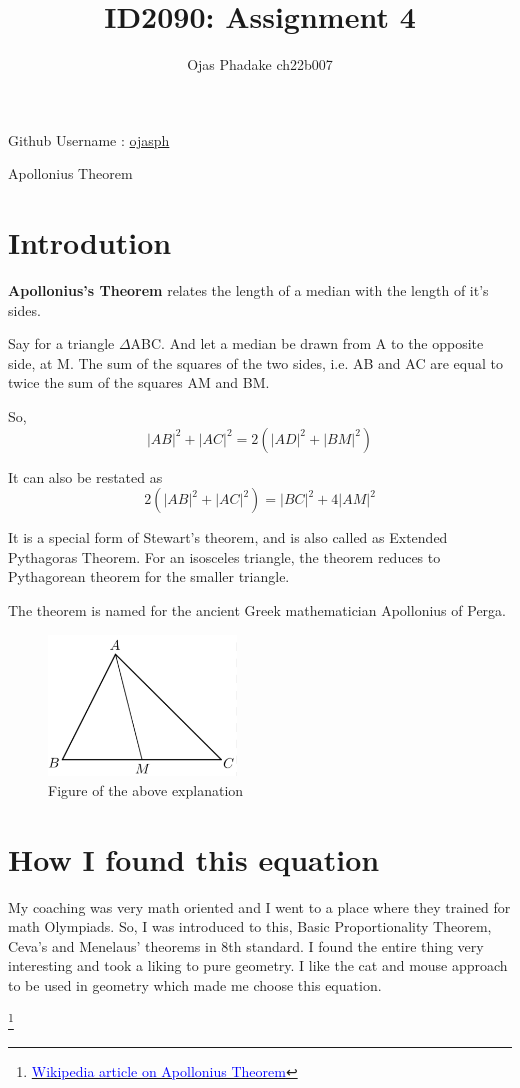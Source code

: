 \documentclass[pdftex]{article}
\title{\textbf{ID2090: Assignment 4}}
\author{Ojas Phadake ch22b007}
\begin{document}
    \maketitle
    \begin{center}
    {Github Username : \href{https://github.com/ojasph}{ojasph} }
\end{center}
{\Huge\begin{center}
    Apollonius Theorem
      \end{center}} 

\section*{Introdution}
\textbf{Apollonius's Theorem} relates the length of  a median with the length of it's sides. 

Say for a triangle $\Delta$ABC. And let a median be drawn from A to the opposite side, at M. The sum of the squares of the two sides, i.e. AB and AC are equal to twice the sum of the squares AM and BM. 

So, 
\begin{equation}
    |AB|^2 + |AC|^2 = 2(|AD|^2 + |BM|^2)
\end{equation}

It can also be restated as 
\begin{equation}
    2(|AB|^2 + |AC|^2) = |BC|^2 + 4|AM|^2
\end{equation}

It is a special form of Stewart's theorem, and is also called as Extended Pythagoras Theorem. For an isosceles triangle, the theorem reduces to Pythagorean theorem for the smaller triangle. 

The theorem is named for the ancient Greek mathematician Apollonius of Perga.

\begin{figure}[H]
    \centering
    \includegraphics[width = 5cm]{Screenshot 2023-06-13 235751.png}
    \caption{Figure of the above explanation}
\end{figure}

\section*{How I found this equation}
My coaching was very math oriented and I went to a place where they trained for math Olympiads. So, I was introduced to this, Basic Proportionality Theorem, Ceva's and Menelaus' theorems in 8th standard. I found the entire thing very interesting and took a liking to pure geometry. I like the cat and mouse approach to be used in geometry which made me choose this equation.

\footnote
{\href{https://en.wikipedia.org/wiki/Apollonius\%27s\_theorem}{\textcolor{blue}{Wikipedia article on Apollonius Theorem}}}
\end{document}
